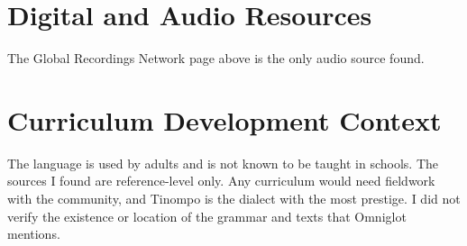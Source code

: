 \documentclass[12pt]{article}
\begin{document}
\section{Digital and Audio Resources}
The Global Recordings Network page above is the only audio source found.

\section{Curriculum Development Context}
The language is used by adults and is not known to be taught in schools. The sources I found are reference-level only. Any curriculum would need fieldwork with the community, and Tinompo is the dialect with the most prestige. I did not verify the existence or location of the grammar and texts that Omniglot mentions.
\end{document}
